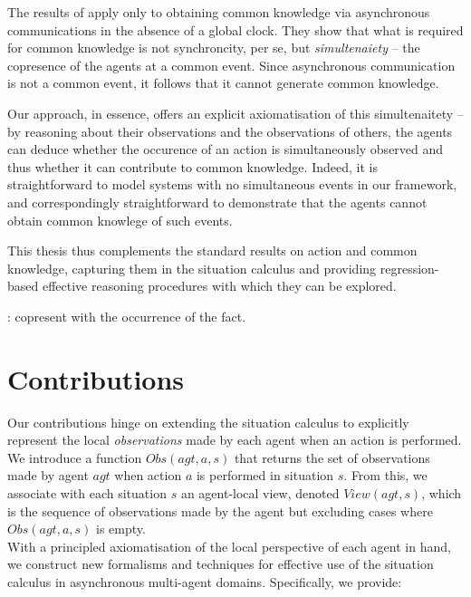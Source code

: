 The results of \citep{halpern90knowledge_distrib} apply only to obtaining common knowledge via asynchronous communications in the absence of a global clock.
They show that what is required for common knowledge is not synchroncity, per
se, but \emph{simultenaiety} -- the copresence of the agents at a common event.
Since asynchronous communication is not a common event, it follows that 
it cannot generate common knowledge.

Our approach, in essence, offers an explicit axiomatisation of this
simultenaitety -- by reasoning about their observations and the observations
of others, the agents can deduce whether the occurence of an action is
simultaneously observed and thus whether it can contribute to common knowledge.
Indeed, it is straightforward to model systems with no simultaneous events in
our framework, and correspondingly straightforward to demonstrate that the
agents cannot obtain common knowlege of such events.

This thesis thus complements the standard results on action and common knowledge, capturing them in the situation calculus and providing regression-based effective reasoning procedures with which they can be explored.


\citep{halpern90knowledge_distrib}: copresent with the occurrence
of the fact.


\section{Contributions}

Our contributions hinge on extending the situation calculus to explicitly
represent the local \emph{observations} made by each agent when an
action is performed. We introduce a function $Obs(agt,a,s)$ that
returns the set of observations made by agent $agt$ when action $a$
is performed in situation $s$. From this, we associate with each
situation $s$ an agent-local view, denoted $View(agt,s)$, which
is the sequence of observations made by the agent but excluding cases
where $Obs(agt,a,s)$ is empty.\\


With a principled axiomatisation of the local perspective of each
agent in hand, we construct new formalisms and techniques for effective
use of the situation calculus in asynchronous multi-agent domains.
Specifically, we provide:


